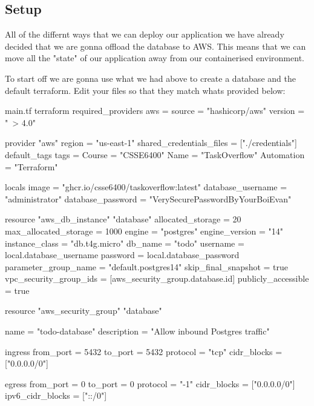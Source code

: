 \documentclass{csse4400}
\begin{document}
\subsection{Setup}

All of the differnt ways that we can deploy our application we have already decided that we are gonna offload the database to AWS. This means that we can move all the "state" of our application away from our containerised environment.

To start off we are gonna use what we had above to create a database and the default terraform. Edit your files so that they match whats provided below:

\begin{code}[language=terraform,numbers=none]{main.tf}
  terraform {
    required_providers {
        aws = {
            source  = "hashicorp/aws"
            version = "~> 4.0"
        }
    }
}

provider "aws" {
    region = "us-east-1"
    shared_credentials_files = ["./credentials"]
    default_tags {
        tags = {
            Course       = "CSSE6400"
            Name         = "TaskOverflow"
            Automation   = "Terraform"
        }
    }
}

locals {
    image             = "ghcr.io/csse6400/taskoverflow:latest"
    database_username = "administrator"
    database_password = "VerySecurePasswordByYourBoiEvan"
}

resource "aws_db_instance" "database" {
  allocated_storage      = 20
  max_allocated_storage  = 1000
  engine                 = "postgres"
  engine_version         = "14"
  instance_class         = "db.t4g.micro"
  db_name                = "todo"
  username               = local.database_username
  password               = local.database_password
  parameter_group_name   = "default.postgres14"
  skip_final_snapshot    = true
  vpc_security_group_ids = [aws_security_group.database.id]
  publicly_accessible    = true
}

resource "aws_security_group" "database" {
  name        = "todo-database"
  description = "Allow inbound Postgres traffic"

  ingress {
    from_port        = 5432
    to_port          = 5432
    protocol         = "tcp"
    cidr_blocks      = ["0.0.0.0/0"]
  }

  egress {
    from_port        = 0
    to_port          = 0
    protocol         = "-1"
    cidr_blocks      = ["0.0.0.0/0"]
    ipv6_cidr_blocks = ["::/0"]
  }
}
\end{code}
\end{document}
